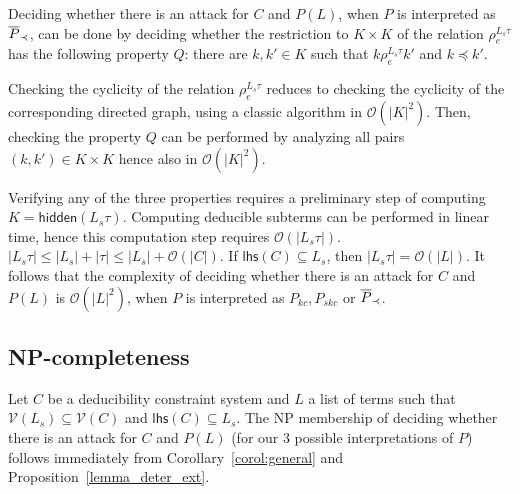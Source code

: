 \documentclass[acmtocl,acmnow]{acmtrans2m}
\newcommand{\comment}[1]{}
\newcommand{\var}{\mathcal{V}}
\newcommand{\lhs}{\mathsf{lhs}}
\newcommand{\HK}{K}
\newcommand{\lset}[1]{#1_s}
\newcommand{\hidden}[1]{\mathsf{hidden}({#1})}
\newcommand{\nko}{\preceq}
\newcommand{\dedsys}[1]{deducibility constraint system}
\begin{document}
Deciding whether there is an attack for $C$ and  $P(L)$, when $P$ is interpreted as  $\overline{P}_{\prec}$, can be done by deciding
whether the  restriction to $K\times K$ of the relation $\rho_e^{\lset{L}\tau}$ has the following
property $Q$: there are $k,k'\in K$ such that $k \rho_e^{\lset{L}\tau} k'$ and $k\nko k'$.


Checking the cyclicity of the relation $\rho_e^{\lset{L}\tau}$ reduces to  checking the
cyclicity of the
corresponding directed graph, using a classic algorithm in $\mathcal{O}(|\HK|^2)$. Then,
checking the property
$Q$ can be performed by analyzing all pairs $(k,k')\in K\times K$ hence also in $\mathcal{O}(|\HK|^2)$.

\smallskip





Verifying any of the three properties requires a preliminary step of computing
$K=\hidden{\lset{L}\tau}$. Computing deducible subterms can be performed in linear
time, hence this computation step requires $\mathcal{O}(|\lset{L}\tau|)$. $|\lset{L}\tau|\leq 
|\lset{L}| + |\tau| \leq |\lset{L}| + \mathcal{O}(|C|)$. If $\lhs(C)\subseteq \lset{L}$,
then $|\lset{L}\tau| = \mathcal{O}(|L|)$. It follows that the complexity of deciding
whether there is an attack for $C$ and $P(L)$ is $\mathcal{O}(|L|^2)$, when $P$ is
interpreted as $P_{kc}, P_{skc}$ or $\overline{P}_{\prec}$.









\comment{ We can have the following possibilities in $V$:
\begin{itemize}
\item[-] $k$ encrypts $k'$. Then $(k,k')$ is an arc in the graph $G$.
\item[-] $k$ encrypts $x$.
\item[-] $y$ encrypts $x$ or $y$ encrypts $k'$. Since $y\in\var(V)$, thus $y\in\var(C)$, it follows that
there is constraint $T_y\Vdash y$ in $C$. Hence $T_y\theta \vdash
y\theta$. We can either that $y\theta$ is a deducible key, and in
this case $y\theta$ is not a part on an encryption cycle (at least
we are not interested in those encryption cycles), either $y\theta$
is not a key, and in this case $y\theta$ cannot encrypt (by our
definition -- no compound keys) other terms.
\end{itemize}
}


\subsection{NP-completeness} Let $C$ be a \dedsys{} and $L$ a list of terms such that
$\var(\lset{L})\subseteq\var(C)$ and $\lhs(C)\subseteq\lset{L}$.
The NP membership of deciding whether there is an attack for $C$ and $P(L)$
(for our 3 possible interpretations of $P$) follows immediately from Corollary~\ref{corol:general}
and Proposition~\ref{lemma_deter_ext}.
\end{document}
